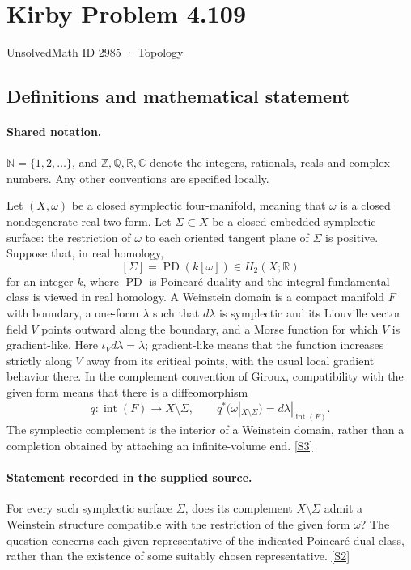 \documentclass[11pt]{article}
\newcommand{\sref}[2]{\hyperlink{source:#1:#2}{[S#2]}}
\begin{document}
\setcounter{section}{2984}
\section{Kirby Problem 4.109}\label{2985}
{\small\sffamily UnsolvedMath ID 2985 · Topology}
\subsection{Definitions and mathematical statement}

\paragraph{Shared notation.}$\mathbb N=\{1,2,\ldots\}$, and $\mathbb Z,\mathbb Q,\mathbb R,\mathbb C$ denote the integers, rationals, reals and complex numbers. Any other conventions are specified locally.


Let $(X,\omega)$ be a closed symplectic four-manifold, meaning that $\omega$ is a closed nondegenerate real two-form. Let $\Sigma\subset X$ be a closed embedded symplectic surface: the restriction of $\omega$ to each oriented tangent plane of $\Sigma$ is positive. Suppose that, in real homology,
\[
[\Sigma]=\operatorname{PD}(k[\omega])\in H_2(X;\mathbb R)
\]
for an integer $k$, where $\operatorname{PD}$ is Poincaré duality and the integral fundamental class is viewed in real homology. A Weinstein domain is a compact manifold $F$ with boundary, a one-form $\lambda$ such that $d\lambda$ is symplectic and its Liouville vector field $V$ points outward along the boundary, and a Morse function for which $V$ is gradient-like. Here $\iota_Vd\lambda=\lambda$; gradient-like means that the function increases strictly along $V$ away from its critical points, with the usual local gradient behavior there. In the complement convention of Giroux, compatibility with the given form means that there is a diffeomorphism
\[
 q:\operatorname{int}(F)\longrightarrow X\setminus\Sigma,
 \qquad q^*(\omega|_{X\setminus\Sigma})=d\lambda|_{\operatorname{int}(F)}.
\]
The symplectic complement is the interior of a Weinstein domain, rather than a completion obtained by attaching an infinite-volume end. \sref{2985}{3}
\paragraph{Statement recorded in the supplied source.}
For every such symplectic surface $\Sigma$, does its complement $X\setminus\Sigma$ admit a Weinstein structure compatible with the restriction of the given form $\omega$? The question concerns each given representative of the indicated Poincaré-dual class, rather than the existence of some suitably chosen representative. \sref{2985}{2}
\end{document}
